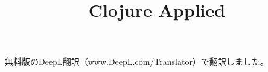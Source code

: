 \documentclass{jsbook}
\title{Clojure Applied}
\begin{document}
\maketitle

無料版のDeepL翻訳（www.DeepL.com/Translator）で翻訳しました。








\end{document}
